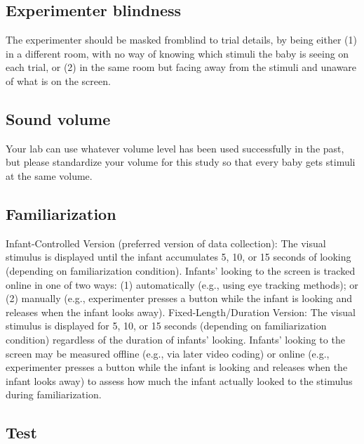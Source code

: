 \documentclass[
]{book}
\begin{document}
\subsection{Experimenter blindness}\label{experimenter-blindness}

The experimenter should be masked fromblind to trial details, by being either (1) in a different room, with no way of knowing which stimuli the baby is seeing on each trial, or (2) in the same room but facing away from the stimuli and unaware of what is on the screen.

\subsection{Sound volume}\label{sound-volume}

Your lab can use whatever volume level has been used successfully in the past, but please standardize your volume for this study so that every baby gets stimuli at the same volume.

\subsection{Familiarization}\label{familiarization}

Infant-Controlled Version (preferred version of data collection):
The visual stimulus is displayed until the infant accumulates 5, 10, or 15 seconds of looking (depending on familiarization condition). Infants' looking to the screen is tracked online in one of two ways: (1) automatically (e.g., using eye tracking methods); or (2) manually (e.g., experimenter presses a button while the infant is looking and releases when the infant looks away).
Fixed-Length/Duration Version:
The visual stimulus is displayed for 5, 10, or 15 seconds (depending on familiarization condition) regardless of the duration of infants' looking. Infants' looking to the screen may be measured offline (e.g., via later video coding) or online (e.g., experimenter presses a button while the infant is looking and releases when the infant looks away) to assess how much the infant actually looked to the stimulus during familiarization.

\subsection{Test}\label{test}
\end{document}
